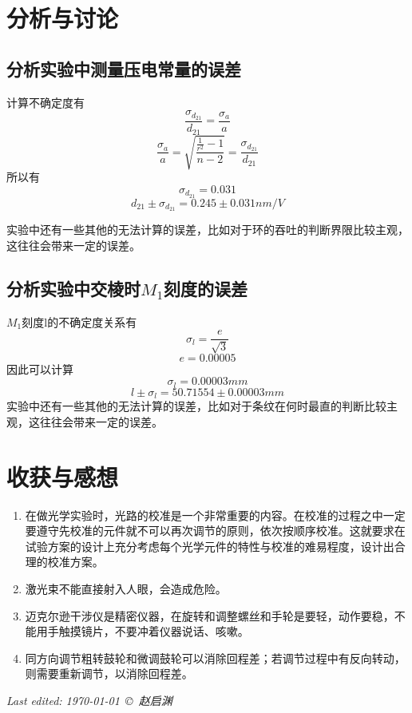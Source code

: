 \documentclass[a4paper,11pt]{article}
\begin{document}
	


\section{分析与讨论}
\subsection{分析实验中测量压电常量的误差}
    计算不确定度有
    $$ \dfrac{\sigma_{d_{21}}}{d_{21}} = \dfrac{\sigma_{a}}{a} $$
    $$ \dfrac{\sigma_{a}}{a} = \sqrt{\dfrac{\frac{1}{r^2} - 1}{n-2}} = \dfrac{\sigma_{d_{21}}}{d_{21}} $$
    所以有
    $$ \sigma_{d_{21}} = 0.031 $$
    $$ d_{21} \pm \sigma_{d_{21}} = 0.245 \pm 0.031 nm/V $$
    
    实验中还有一些其他的无法计算的误差，比如对于环的吞吐的判断界限比较主观，这往往会带来一定的误差。
    

	

	
\subsection{分析实验中交棱时$M_1$刻度的误差}
    $M_1$刻度l的不确定度关系有
	$$ \sigma_l = \dfrac{e}{\sqrt{3}}$$
	$$ e = 0.00005$$
	因此可以计算
	$$ \sigma_l = 0.00003 mm $$
	$$ l \pm \sigma_{l} = 50.71554 \pm 0.00003 mm$$
	实验中还有一些其他的无法计算的误差，比如对于条纹在何时最直的判断比较主观，这往往会带来一定的误差。
	



	
\section{收获与感想}
\begin{enumerate}
	\item 在做光学实验时，光路的校准是一个非常重要的内容。在校准的过程之中一定要遵守先校准的元件就不可以再次调节的原则，依次按顺序校准。这就要求在试验方案的设计上充分考虑每个光学元件的特性与校准的难易程度，设计出合理的校准方案。
	\item 激光束不能直接射入人眼，会造成危险。
	\item 迈克尔逊干涉仪是精密仪器，在旋转和调整螺丝和手轮是要轻，动作要稳，不能用手触摸镜片，不要冲着仪器说话、咳嗽。
	\item 同方向调节粗转鼓轮和微调鼓轮可以消除回程差；若调节过程中有反向转动，则需要重新调节，以消除回程差。
\end{enumerate}



	\vfill\noindent\itshape\footnotesize
	\hfill Last edited: \today\ \copyright\ 赵启渊
\end{document}
